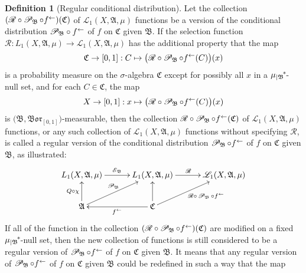 \documentclass[
twoside=true,
paper=letter,
fontsize=11pt,
pagesize=auto,
leqno,
openany,
headsepline,
overfullrule,
]{scrbook}
\theoremstyle{plain}
\theoremstyle{plain}
\theoremstyle{definition}
\theoremstyle{bfnoteitalic}
\theoremstyle{bfnoteroman}
\newtheorem{defnboldnote}[thm]{Definition}
\newcommand{\sigalg}[1]{\mathfrak{#1}}
\newcommand{\cali}[1]{\mathscr{#1}}
\newcommand{\condexpop}[1]{\mathop{\cali{E}\hspace{-1pt}}\nolimits_{#1}}
\newcommand{\condprobop}[1]{\mathop{\cali{P}\hspace{-1pt}}\nolimits_{#1}}
\newcommand{\borel}{\mathfrak{Bor}}
\newcommand{\textsigma}{\hbox{\large{$\sigma$}}\kern-1pt}
\newcommand{\restrictedto}[1]{_{\lvert#1}\kern-1.5pt}
\newcommand{\preimage}[1]{#1^{\leftarrow}}
\newcommand{\sigmaalgebra}{\sigalg{A}}
\newcommand{\sigmaalgebraii}{\sigalg{B}}
\newcommand{\sigmaalgebraiii}{\sigalg{C}}
\newcommand{\kernast}{\ast\kern-1pt}
\newcommand{\Lone}{L_1(\measurespace, \sigmaalgebra, \measure)}
\newcommand{\caliLone}{\cali{L}_1(\measurespace, \sigmaalgebra, \measure)}
\newcommand{\function}{f}
\newcommand{\measurespace}{X}
\newcommand{\mspaceelt}{x}
\newcommand{\measure}{\mu}
\newcommand{\setiii}{C}
\newcommand{\regular}{\cali{R}}
\begin{document}
\begin{defnboldnote}[Regular conditional distribution]\label{regular_conditional_distribution}
Let the collection
$(\regular\circ\condprobop{\sigmaalgebraii}\circ\preimage{\function})
(\sigmaalgebraiii)$ of $\caliLone$ functions be a version of the conditional distribution
${\condprobop{\sigmaalgebraii}}\circ \preimage{\function}$ of $\function$ on $\sigmaalgebraiii$ given  
$\sigmaalgebraii$.
If the selection function 
$\regular:\Lone\to\caliLone$
has the additional property that the map
\[
\sigmaalgebraiii\to [0,1]: \setiii \mapsto 
\bigl( \regular\circ\condprobop{\sigmaalgebraii} \circ\preimage{\function}
(\setiii)\bigr)(\mspaceelt)
\]
is a probability measure on the \textsigma\hyp{}algebra $\sigmaalgebraiii$ except for possibly all
$\mspaceelt$ in a 
${\measure\restrictedto{\sigmaalgebraii}}^\kernast$-null set,
and for each
$\setiii\in\sigmaalgebraiii$, the map 
\[
\measurespace\to [0,1] : \mspaceelt\mapsto
\bigl( \regular\circ\condprobop{\sigmaalgebraii}\circ\preimage{\function}
(\setiii)\bigr)(\mspaceelt)
\]
is $\bigl(\sigmaalgebraii, \borel_{[0,1]}\bigr)$\hyp{}measurable,
then the collection 
$\regular\circ\condprobop{\sigmaalgebraii}\circ\preimage{\function}
(\sigmaalgebraiii)$ 
of 
$\caliLone$ functions, or any such collection of 
$\caliLone$ functions without specifying $\regular$,
is called a regular version of the conditional distribution 
$\condprobop{\sigmaalgebraii}\circ\preimage{\function}$ of $\function$ on 
$\sigmaalgebraiii$ given $\sigmaalgebraii$,
as illustrated:
\[
\xymatrix@C=30pt{ 
\Lone \ar[r]^{\condexpop{\sigmaalgebraii}} 
& \Lone \ar[r]^{\regular} & \caliLone
\\
\sigmaalgebra \ar[u]^-{Q\circ\chi} \ar[ur]^{\condprobop{\sigmaalgebraii}} 
& \sigmaalgebraiii 
\ar[l]^{\preimage{\function}} 
\ar[u]
\ar[ur]_{\regular
\makebox[0pt][l]{$\scriptstyle{\circ\condprobop{\sigmaalgebraii}\circ\preimage{\function}}$}
}
\\
}
\]
If all of the function in the collection
$(\regular\circ\condprobop{\sigmaalgebraii}\circ\preimage{\function})
(\sigmaalgebraiii)$
are modified on a fixed
${\measure\restrictedto\sigmaalgebraii}^\kernast$-null set, then the new collection of functions is still considered to be a 
regular version of 
$\condprobop{\sigmaalgebraii}\circ\preimage{\function}$ 
of $\function$
on $\sigmaalgebraiii$ given $\sigmaalgebraii$.
It means that any regular version of 
$\condprobop{\sigmaalgebraii}\circ\preimage{\function}$ 
of $\function$
on $\sigmaalgebraiii$ given $\sigmaalgebraii$
could be redefined in such a way that the map

\end{defnboldnote}
\end{document}
